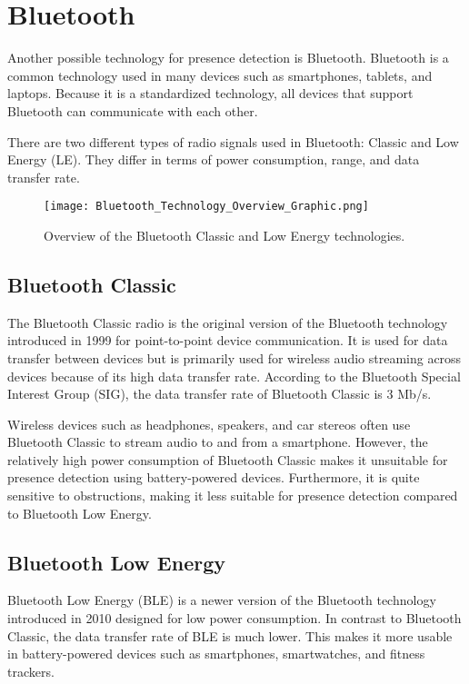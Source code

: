 \section{Bluetooth} \label{sec:bluetooth}

Another possible technology for presence detection is Bluetooth.
Bluetooth is a common technology used in many devices such as smartphones, tablets, and laptops.
Because it is a standardized technology, all devices that support Bluetooth can communicate with each other.

There are two different types of radio signals used in Bluetooth: Classic and Low Energy (LE).
They differ in terms of power consumption, range, and data transfer rate.\cite{BluetoothSIG}

\begin{figure}[h!]
  \centering
  \texttt{[image: Bluetooth\_Technology\_Overview\_Graphic.png]}
  \caption{Overview of the Bluetooth Classic and Low Energy technologies\cite{BluetoothOverview}.}
  \label{fig:classic_vs_LE}
\end{figure}

\subsection{Bluetooth Classic} \label{sec:bluetooth_classic}
The Bluetooth Classic radio is the original version of the Bluetooth technology introduced in 1999 for point-to-point device communication.
It is used for data transfer between devices but is primarily used for wireless audio streaming across devices because of its high data transfer rate.
According to the Bluetooth Special Interest Group (SIG), the data transfer rate of Bluetooth Classic is 3 Mb/s.

Wireless devices such as headphones, speakers, and car stereos often use Bluetooth Classic to stream audio to and from a smartphone.
However, the relatively high power consumption of Bluetooth Classic makes it unsuitable for presence detection using battery-powered devices.
Furthermore, it is quite sensitive to obstructions, making it less suitable for presence detection compared to Bluetooth Low Energy.\cite{BluetoothSIG}

\subsection{Bluetooth Low Energy} \label{sec:bluetooth_low_energy}
Bluetooth Low Energy (BLE) is a newer version of the Bluetooth technology introduced in 2010 designed for low power consumption.
In contrast to Bluetooth Classic, the data transfer rate of BLE is much lower.
This makes it more usable in battery-powered devices such as smartphones, smartwatches, and fitness trackers.

